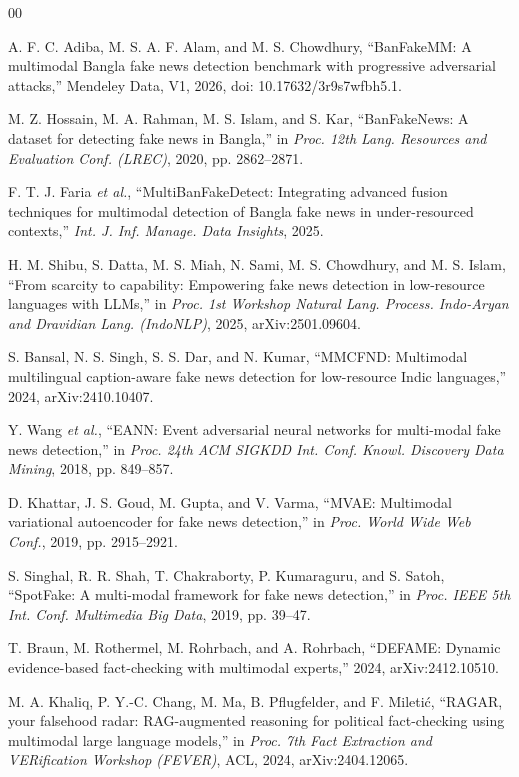 \documentclass[conference,a4paper]{IEEEtran}
\begin{document}
\begin{thebibliography}{00}

 A. F. C. Adiba, M. S. A. F. Alam, and M. S. Chowdhury,
``BanFakeMM: A multimodal Bangla fake news detection benchmark with progressive
adversarial attacks,'' Mendeley Data, V1, 2026, doi: 10.17632/3r9s7wfbh5.1.

 M. Z. Hossain, M. A. Rahman, M. S. Islam, and S. Kar,
``BanFakeNews: A dataset for detecting fake news in Bangla,'' in
\emph{Proc. 12th Lang. Resources and Evaluation Conf. (LREC)}, 2020,
pp. 2862--2871.

 F. T. J. Faria \emph{et al.}, ``MultiBanFakeDetect:
Integrating advanced fusion techniques for multimodal detection of Bangla fake
news in under-resourced contexts,'' \emph{Int. J. Inf. Manage. Data Insights},
2025.

 H. M. Shibu, S. Datta, M. S. Miah, N. Sami,
M. S. Chowdhury, and M. S. Islam, ``From scarcity to capability: Empowering
fake news detection in low-resource languages with LLMs,'' in
\emph{Proc. 1st Workshop Natural Lang. Process. Indo-Aryan and Dravidian Lang.
(IndoNLP)}, 2025, arXiv:2501.09604.

 S. Bansal, N. S. Singh, S. S. Dar, and N. Kumar, ``MMCFND:
Multimodal multilingual caption-aware fake news detection for low-resource
Indic languages,'' 2024, arXiv:2410.10407.

 Y. Wang \emph{et al.}, ``EANN: Event adversarial neural
networks for multi-modal fake news detection,'' in \emph{Proc. 24th ACM SIGKDD
Int. Conf. Knowl. Discovery Data Mining}, 2018, pp. 849--857.

 D. Khattar, J. S. Goud, M. Gupta, and V. Varma, ``MVAE:
Multimodal variational autoencoder for fake news detection,'' in \emph{Proc.
World Wide Web Conf.}, 2019, pp. 2915--2921.

 S. Singhal, R. R. Shah, T. Chakraborty, P. Kumaraguru, and
S. Satoh, ``SpotFake: A multi-modal framework for fake news detection,'' in
\emph{Proc. IEEE 5th Int. Conf. Multimedia Big Data}, 2019, pp. 39--47.

 T. Braun, M. Rothermel, M. Rohrbach, and A. Rohrbach,
``DEFAME: Dynamic evidence-based fact-checking with multimodal experts,''
2024, arXiv:2412.10510.

 M. A. Khaliq, P. Y.-C. Chang, M. Ma, B. Pflugfelder, and
F. Mileti\'{c}, ``RAGAR, your falsehood radar: RAG-augmented reasoning for
political fact-checking using multimodal large language models,'' in
\emph{Proc. 7th Fact Extraction and VERification Workshop (FEVER)}, ACL, 2024,
arXiv:2404.12065.


\end{thebibliography}
\end{document}
